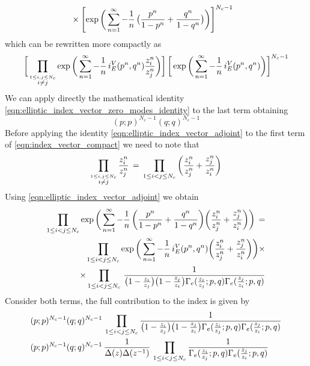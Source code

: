 \begin{appendices}
\begin{equation}
\begin{aligned}
& \times \left[ \exp \bigg( \sum_{n=1}^{\infty} - {1 \over n} \, \big( {p^n \over 1-p^n} + {q^n \over 1-q^n} \big) \bigg) \right] ^{N_c-1}
\end{aligned}
\end{equation}
which can be rewritten more compactly as
\begin{equation}
\bigg[\prod_{\overset{ 1 \leq i,j \leq N_c}{i\neq j}} \exp \bigg( \sum_{n=1}^{\infty} - {1 \over n} \, i_E^V(p^n,q^n)  {z_i^n \over z_j^n}\bigg) \bigg] \,
\bigg[ \exp \bigg( \sum_{n=1}^{\infty} - {1 \over n} \,  i_E^V(p^n,q^n) \bigg) \bigg] ^{N_c-1}
\label{eqn:index_vector_compact}
\end{equation}
We can apply directly the mathematical identity \eqref{eqn:elliptic_index_vector_zero_modes_identity} to the last term obtaining
$$
	(p;p)^{N_c-1} ( q;q)^{N_c-1}
$$
Before applying the identity \eqref{eqn:elliptic_index_vector_adjoint} to the first term of  \eqref{eqn:index_vector_compact} we need to note that 
$$
 \prod_{ \overset{ 1 \leq i,j \leq N_c}{ i\neq j }} {z_i^n \over z_j^n} \,  = \,
  \prod_{ 1 \leq i < j \leq N_c}\bigg( {z_i^n \over z_j^n} + {z_j^n \over z_i^n}   \bigg)
 $$
Using \eqref{eqn:elliptic_index_vector_adjoint} we obtain
\begin{align*}
\prod_{ 1 \leq i < j \leq N_c} \exp \bigg( \sum_{n=1}^{\infty} - {1 \over n} \, \bigg( {p^n \over 1-p^n} + {q^n \over 1-q^n} \bigg)  \bigg( {z_i^n \over z_j^n} + {z_j^n \over z_i^n}\bigg) \bigg) \, =\\
\prod_{ 1 \leq i < j \leq N_c} \exp \bigg( \sum_{n=1}^{\infty} - {1 \over n} \, i_E^V(p^n,q^n)  \bigg( {z_i^n \over z_j^n} + {z_j^n \over z_i^n}\bigg) \bigg) \times
\\
\times  \prod_{ 1 \leq i < j \leq N_c}   \, \frac{ 1 } { \big( 1 -{ z_i \over z_j} \big) \big ( 1 - { z_j \over z_i} \big) \Gamma_e( {z_i \over z_j};p,q) \Gamma_e({z_j \over z_i}; p,q)  }
\end{align*}
Consider both terms, the full contribution to the index is given by  \begin{align*}
& (p;p)^{N_c-1} ( q;q)^{N_c-1} \, \prod_{ 1 \leq i < j \leq N_c} \frac{ 1 }{ \big( 1 -{ z_i \over z_j} \big) \big ( 1 - { z_j \over z_i} \big) \Gamma_e( {z_i \over z_j};p,q) \Gamma_e({z_j \over z_i}; p,q)  } \\
& (p;p)^{N_c-1} ( q;q)^{N_c-1} \, \frac{1}{ \Delta(z) \Delta (z^{-1})} \, \prod_{ 1 \leq i < j \leq N_c} \frac{ 1 }{ \Gamma_e( {z_i \over z_j};p,q) \Gamma_e({z_j \over z_i}; p,q)}
\end{align*}





\end{appendices}
